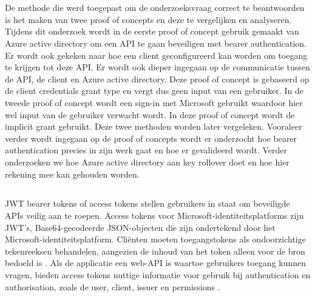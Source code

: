 
\chapter{}
\label{ch:methodologie}


De methode die werd toegepast om de onderzoeksvraag correct te beantwoorden is het maken van twee proof of concepts en deze te vergelijken en analyseren. Tijdens dit onderzoek wordt in de eerste proof of concept gebruik gemaakt van Azure active directory om een API te gaan beveiligen met bearer authentication. Er wordt ook gekeken naar hoe een client geconfigureerd kan worden om toegang te krijgen tot deze API. Er wordt ook dieper ingegaan op de communicatie tussen de API, de client en Azure active directory. Deze proof of concept is gebaseerd op de client credentials grant type en vergt dus geen input van een gebruiker. In de tweede proof of concept wordt een sign-in met Microsoft gebruikt waardoor hier wel input van de gebruiker verwacht wordt. In deze proof of concept wordt de implicit grant gebruikt. Deze twee methoden worden later vergeleken. Vooraleer verder wordt ingegaan op de proof of concepts wordt er onderzocht hoe bearer authentication precies in zijn werk gaat en hoe er gevalideerd wordt. Verder onderzoeken we hoe Azure active directory aan key rollover doet en hoe hier rekening mee kan gehouden worden.

\section{}
JWT bearer tokens of access tokens stellen gebruikers in staat om beveiligde APIs veilig aan te roepen. Access tokens voor Microsoft-identiteitsplatforms zijn JWT's, Base64-gecodeerde JSON-objecten die zijn ondertekend door het Microsoft-identiteitsplatform. Cliënten moeten toegangstokens als ondoorzichtige tekenreeksen behandelen, aangezien de inhoud van het token alleen voor de bron bedoeld is \autocite{hpsin2020}.\newline
Als de applicatie een web-API is waartoe gebruikers toegang kunnen vragen, bieden access tokens nuttige informatie voor gebruik bij authentication en authorisation, zoals de user, client, issuer en permissions \autocite{hpsin2020}.

